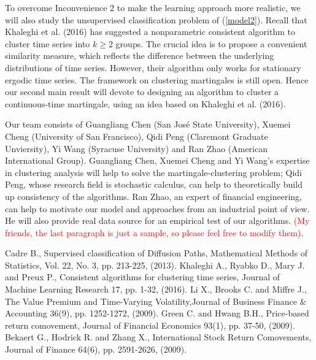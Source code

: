 \documentclass[9pt,a4paper]{article}
\begin{document}
 To overcome Inconvenience 2 to make the learning approach more realistic, we will also study the unsupervised classification problem of (\ref{model2}). Recall that Khaleghi et al. (2016) has suggested a nonparametric consistent algorithm to cluster time series into $k\ge2$ groups. The crucial idea is to propose a convenient similarity measure, which reflects the difference between the underlying distributions of time series. However, their algorithm only works for stationary ergodic time series. The framework on clustering martingales is still open. Hence our second main result will devote to designing an algorithm to cluster a continuous-time martingale, using an idea based on Khaleghi et al. (2016).

 Our team consists of Guangliang Chen (San Jos\'e State University), Xuemei Cheng (University of San Francisco), Qidi Peng (Claremont Graduate Unviersity), Yi Wang (Syracuse University) and Ran Zhao (American International Group). Guangliang Chen, Xuemei Cheng and Yi Wang's expertise in clustering analysis will help to solve the martingale-clustering problem; Qidi Peng, whose research field is stochastic calculus, can help to theoretically build up consistency of the algorithms. Ran Zhao, an expert of financial engineering, can help to motivate our model and approaches from an industrial point of view. He will also provide real data source for an empirical test of our algorithms. \textcolor{red}{(My friends, the last paragraph is just a sample, so please feel free to modify them).}
 \begin{thebibliography}{99}
 Cadre B., Supervised classification of Diffusion Paths, Mathematical Methods of Statistics, Vol. 22, No. 3, pp. 213-225, (2013).
 Khaleghi A., Ryabko D., Mary J. and Preux P., Consistent algorithms for clustering time series, Journal of Machine Learning Research 17, pp. 1-32, (2016).
 Li X., Brooks C. and Miffre J., The Value Premium and Time-Varying Volatility,Journal of Business Finance \& Accounting 36(9), pp. 1252-1272, (2009).
 Green C. and Hwang B.H., Price-based return comovement, Journal of Financial Economics 93(1), pp. 37-50, (2009).
 Bekaert G., Hodrick R. and Zhang X., International Stock Return Comovements, Journal of Finance 64(6), pp. 2591-2626, (2009).
\end{thebibliography}
\end{document}
